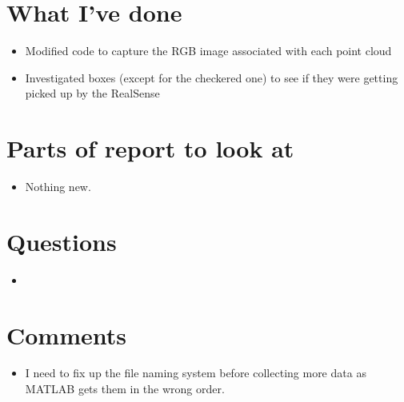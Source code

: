 \documentclass[12pt,a4paper]{article}
\begin{document}
\author{Katrina Ashton}


\pagestyle{fancy}
\fancyhf{}
\rhead{\thepage}

\section{What I've done}
\begin{itemize}
\item{Modified code to capture the RGB image associated with each point cloud}
\item{Investigated boxes (except for the checkered one) to see if they were getting picked up by the RealSense}
\end{itemize}

\section{Parts of report to look at}
\begin{itemize}
\item{Nothing new.}
\end{itemize}

\section{Questions}
\begin{itemize}
\item
\end{itemize}

\section{Comments}
\begin{itemize}
\item I need to fix up the file naming system before collecting more data as MATLAB gets them in the wrong order.
\end{itemize}
\end{document}
